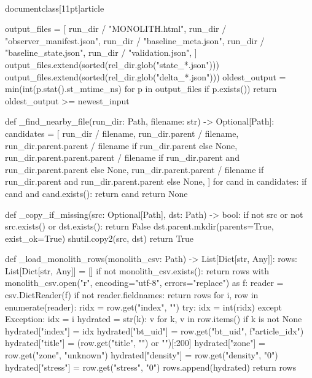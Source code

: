 \\documentclass[11pt]{article}
\begin{document}
\begin{CodeBlock}
    output_files = [
        run_dir / "MONOLITH.html",
        run_dir / "observer_manifest.json",
        run_dir / "baseline_meta.json",
        run_dir / "baseline_state.json",
        run_dir / "validation.json",
    ]
    output_files.extend(sorted(rel_dir.glob("state_*.json")))
    output_files.extend(sorted(rel_dir.glob("delta_*.json")))
    oldest_output = min(int(p.stat().st_mtime_ns) for p in output_files if p.exists())
    return oldest_output >= newest_input


def _find_nearby_file(run_dir: Path, filename: str) -> Optional[Path]:
    candidates = [
        run_dir / filename,
        run_dir.parent / filename,
        run_dir.parent.parent / filename if run_dir.parent else None,
        run_dir.parent.parent.parent / filename if run_dir.parent and run_dir.parent.parent else None,
        run_dir.parent.parent / filename if run_dir.parent and run_dir.parent.parent else None,
    ]
    for cand in candidates:
        if cand and cand.exists():
            return cand
    return None


def _copy_if_missing(src: Optional[Path], dst: Path) -> bool:
    if not src or not src.exists() or dst.exists():
        return False
    dst.parent.mkdir(parents=True, exist_ok=True)
    shutil.copy2(src, dst)
    return True


def _load_monolith_rows(monolith_csv: Path) -> List[Dict[str, Any]]:
    rows: List[Dict[str, Any]] = []
    if not monolith_csv.exists():
        return rows
    with monolith_csv.open("r", encoding="utf-8", errors="replace") as f:
        reader = csv.DictReader(f)
        if not reader.fieldnames:
            return rows
        for i, row in enumerate(reader):
            ridx = row.get("index", "")
            try:
                idx = int(ridx)
            except Exception:
                idx = i
            hydrated = {str(k): v for k, v in row.items() if k is not None}
            hydrated["index"] = idx
            hydrated["bt_uid"] = row.get("bt_uid", f"article_{idx}")
            hydrated["title"] = (row.get("title", "") or "")[:200]
            hydrated["zone"] = row.get("zone", "unknown")
            hydrated["density"] = row.get("density", "0")
            hydrated["stress"] = row.get("stress", "0")
            rows.append(hydrated)
    return rows



\end{CodeBlock}
\end{document}
